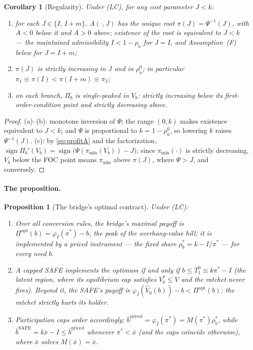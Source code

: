 \documentclass[11pt]{article}
\newtheorem{proposition}{Proposition}
\newtheorem{corollary}{Corollary}
\theoremstyle{definition}
\newcommand{\pimin}{\pi_{\min}}
\begin{document}
\begin{corollary}[Regularity]\label{lem:regularity}
Under (LC), for any cost parameter $J<k$:
\begin{enumerate}[label=(\alph*), itemsep=0pt]
\item for each $J\in\{I,\,I+m\}$, $A(\cdot,J)$ has the \emph{unique} root $\pi(J)=\Psi^{-1}(J)$, with $A<0$ below it and $A>0$ above; existence of the root is \emph{equivalent} to $J<k$ --- the maintained admissibility $I<1-\rho_a$ for $J=I$, and Assumption~(F) below for $J=I+m$;
\item $\pi(J)$ is strictly increasing in $J$ and in $\rho_a^{0}$; in particular $\pi_1\equiv\pi(I)<\pi(I+m)\equiv\pi_2$;
\item on each branch, $\Pi_b$ is single-peaked in $V_b$: strictly increasing below its first-order-condition point and strictly decreasing above.
\end{enumerate}
\end{corollary}

\begin{proof}
(a)--(b): monotone inversion of $\Psi$; the range $(0,k)$ makes existence equivalent to $J<k$; and $\Psi$ is proportional to $k=1-\rho_a^{0}$, so lowering $k$ raises $\Psi^{-1}(J)$. (c): by \eqref{eq:profitA} and the factorization, $\operatorname{sign}\Pi_b'(V_b)=\operatorname{sign}\bigl(\Psi(\pimin(V_b))-J\bigr)$; since $\pimin(\cdot)$ is strictly decreasing, $V_b$ below the FOC point means $\pimin$ above $\pi(J)$, where $\Psi>J$, and conversely.
\end{proof}




\paragraph{The proposition.}

\begin{proposition}[The bridge's optimal contract]\label{prop:instrument}
Under (LC):
\begin{enumerate}[label=(\roman*), itemsep=0pt]
\item Over all conversion rules, the bridge's maximal payoff is $\Pi^{\mathrm{opt}}(b)=\varphi_I(\pi^{*})-b$, the peak of the overhang-value hill; it is implemented by a \emph{priced} instrument --- the fixed share $\rho_b^{*}=k-I/\pi^{*}$ --- for every need $b$.
\item A capped SAFE implements the optimum if and only if $b\le T_1^{0}\equiv k\pi^{*}-I$ (the \emph{latent} region, where its equilibrium cap satisfies $V_b^{*}\le V$ and the ratchet never fires). Beyond it, the SAFE's payoff is $\varphi_I(\hat V_0(b))-b<\Pi^{\mathrm{opt}}(b)$: \emph{the ratchet strictly hurts its holder}.
\item Participation caps order accordingly: $\bar b^{\mathrm{priced}}=\varphi_I(\pi^{*})=M(\pi^{*})\rho_b^{*}$, while $\bar b^{\mathrm{SAFE}}=k\bar x-I\le\bar b^{\mathrm{priced}}$ whenever $\pi^{*}<\bar x$ (and the caps coincide otherwise), where $\bar x$ solves $M(\bar x)=\bar x$.
\end{enumerate}
\end{proposition}
\end{document}
